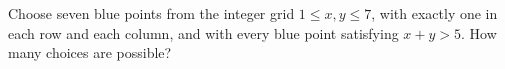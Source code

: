 Choose seven blue points from the integer grid $1\le x,y\le7$, with exactly one in each row and each column, and with every blue point satisfying $x+y>5$. How many choices are possible?
